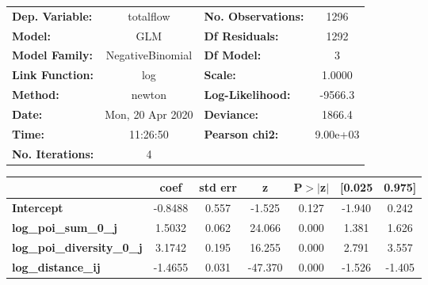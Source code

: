 \begin{center}
\begin{tabular}{lclc}
\toprule
\textbf{Dep. Variable:}            &    totalflow     & \textbf{  No. Observations:  } &     1296    \\
\textbf{Model:}                    &       GLM        & \textbf{  Df Residuals:      } &     1292    \\
\textbf{Model Family:}             & NegativeBinomial & \textbf{  Df Model:          } &        3    \\
\textbf{Link Function:}            &       log        & \textbf{  Scale:             } &    1.0000   \\
\textbf{Method:}                   &      newton      & \textbf{  Log-Likelihood:    } &   -9566.3   \\
\textbf{Date:}                     & Mon, 20 Apr 2020 & \textbf{  Deviance:          } &    1866.4   \\
\textbf{Time:}                     &     11:26:50     & \textbf{  Pearson chi2:      } &  9.00e+03   \\
\textbf{No. Iterations:}           &        4         & \textbf{                     } &             \\
\bottomrule
\end{tabular}
\begin{tabular}{lcccccc}
                                   & \textbf{coef} & \textbf{std err} & \textbf{z} & \textbf{P$> |$z$|$} & \textbf{[0.025} & \textbf{0.975]}  \\
\midrule
\textbf{Intercept}                 &      -0.8488  &        0.557     &    -1.525  &         0.127        &       -1.940    &        0.242     \\
\textbf{log\_poi\_sum\_0\_j}       &       1.5032  &        0.062     &    24.066  &         0.000        &        1.381    &        1.626     \\
\textbf{log\_poi\_diversity\_0\_j} &       3.1742  &        0.195     &    16.255  &         0.000        &        2.791    &        3.557     \\
\textbf{log\_distance\_ij}         &      -1.4655  &        0.031     &   -47.370  &         0.000        &       -1.526    &       -1.405     \\
\bottomrule
\end{tabular}
\end{center}